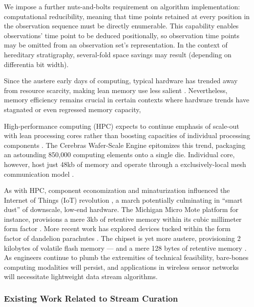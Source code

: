 We impose a further nuts-and-bolts requirement on algorithm implementation: computational reducibility, meaning that time points retained at every position in the observation sequence must be directly enumerable.
This capability enables observations' time point to be deduced positionally, so observation time points may be omitted from an observation set's representation.
In the context of hereditary stratigraphy, several-fold space savings may result (depending on differentia bit width).

Since the austere early days of computing, typical hardware has trended away from resource scarcity, making lean memory use less salient \citep{kushida2015cloud}.
Nevertheless, memory efficiency remains crucial in certain contexts where hardware trends have stagnated or even regressed memory capacity,

High-performance computing (HPC) expects to continue emphasis of scale-out with lean processing cores rather than boosting capacities of individual processing components \citep{sutter2005free,morgenstern2021unparalleled}.
The Cerebras Wafer-Scale Engine epitomizes this trend, packaging an astounding 850,000 computing elements onto a single die.
Individual core, however, host just 48kb of memory and operate through a exclusively-local mesh communication model \citep{cerebras2021wafer,lauterbach2021path}.

As with HPC, component economization and minaturization influenced the Internet of Things (IoT) revolution \citep{rfc7228,ojo2018review}, a march potentially culminating in ``smart dust'' \citep{warneke2001smart} of downscale, low-end hardware.
The Michigan Micro Mote platform for instance, provisions a mere 3kb of retentive memory within its cubic millimeter form factor \citep{lee2012modular}.
More recent work has explored devices tucked within the form factor of dandelion parachutes \citep{iyer2022wind}.
The chipset is yet more austere, provisioning 2 kilobytes of volatile flash memory --- and a mere 128 bytes of retentive memory \citep{microchip2014atiny20}.
As engineers continue to plumb the extremities of technical feasibility, bare-bones computing modalities will persist, and applications in wireless sensor networks will necessitate lightweight data stream algorithms.

\subsubsection{Existing Work Related to Stream Curation}

